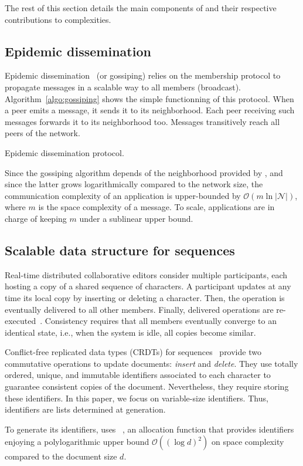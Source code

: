 The rest of this section details the main components of \CRATE and their
respective contributions to complexities.


\subsection{Epidemic dissemination}
\label{subsec:gossiping}

Epidemic dissemination~\cite{birman1999bimodal,demers1987epidemic} (or
gossiping) relies on the membership protocol to propagate messages in a scalable
way to all members (broadcast). Algorithm~\ref{algo:gossiping} shows the simple
functionning of this protocol. When a peer emits a message, it sends it to its
neighborhood. Each peer receiving such messages forwards it to its neighborhood
too. Messages transitively reach all peers of the network.

\begin{algorithm}[h]
  
  \caption{\label{algo:gossiping}Epidemic dissemination protocol.}
\end{algorithm}

Since the gossiping algorithm depends of the neighborhood provided by \SPRAY,
and since the latter grows logarithmically compared to the network size, the
communication complexity of an application is upper-bounded by
$\mathcal{O}(m \ln |\mathcal{N}|)$, where $m$ is the space complexity of a
message. To scale, applications are in charge of keeping $m$ under a sublinear
upper bound.

\subsection{Scalable data structure for sequences}

Real-time distributed collaborative editors consider multiple participants, each
hosting a copy of a shared sequence of characters. A participant updates at any
time its local copy by inserting or deleting a character. Then, the operation is
eventually delivered to all other members. Finally, delivered operations are
re-executed~\cite{saito2005optimistic}. Consistency requires that all members
eventually converge to an identical state, i.e., when the system is idle, all
copies become similar.

Conflict-free replicated data types (CRDTs) for
sequences~\cite{shapiro2011conflict, shapiro2011comprehensive} provide two
commutative operations to update documents: \emph{insert} and \emph{delete}.
They use totally ordered, unique, and immutable identifiers associated to each
character to guarantee consistent copies of the document. Nevertheless, they
require storing these identifiers. In this paper, we focus on variable-size
identifiers. Thus, identifiers are lists determined at generation.

To generate its identifiers, \CRATE uses \LSEQ~\cite{nedelec2013lseq}, an
allocation function that provides identifiers enjoying a polylogarithmic upper
bound $\mathcal{O}((\log d)^2)$ on space complexity compared to the document
size $d$.

